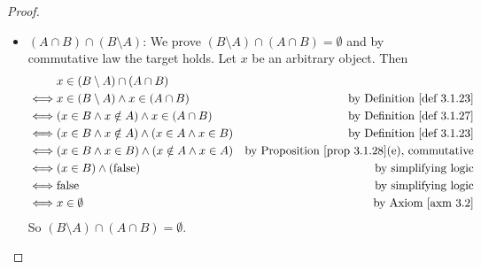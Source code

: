 \begin{proof}
\begin{itemize}
    \item \((A \cap B) \cap (B \setminus A)\): We prove \((B \setminus A) \cap (A \cap B) = \emptyset\) and by commutative law the target holds. Let \(x\) be an arbitrary object. Then
        \begin{align*}
             & x \in (B \setminus A) \cap (A \cap B) \\
        \iff & x \in (B \setminus A) \land x \in (A \cap B) & \text{by \DEF{3.1.23}} \\
        \iff & (x \in B \land x \notin A) \land x \in (A \cap B) & \text{by \DEF{3.1.27}} \\
        \iff & (x \in B \land x \notin A) \land (x \in A \land x \in B) & \text{by \DEF{3.1.23}} \\
        \iff & (x \in B \land x \in B) \land (x \notin A \land x \in A) & \text{by \PROP{3.1.28}(e), commutative} \\
        \iff & (x \in B) \land (\text{false}) & \text{by simplifying logic} \\
        \iff & \text{false} & \text{by simplifying logic} \\
        \iff & x \in \emptyset & \text{by \AXM{3.2}}
        \end{align*}
        So \((B \setminus A) \cap (A \cap B) = \emptyset\).
\end{itemize}


\end{proof}

